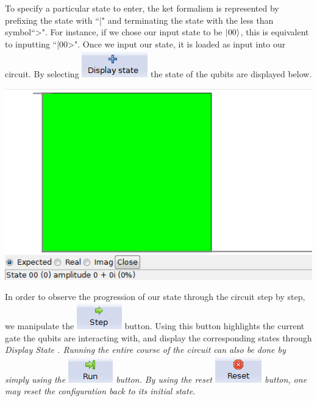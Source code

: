 \documentclass[10pt]{article}
\theoremstyle{definition}
\newcommand{\microspace}{\mspace{0.5mu}}
\def \lket {\left|}
\def \rket {\right\rangle}
\newcommand{\ket}[1]{\lket\microspace #1 \microspace\rket}
\begin{document}
To specify a particular state to enter, the ket formalism is represented by prefixing the state with ``|"  and terminating the state with the less than symbol``>". For instance, if we chose our input state to be $\ket{00}$, this is equivalent to inputting ``|00>". Once we input our state, it is loaded as input into our circuit. By selecting \includegraphics[scale=0.60]{Figures/Navigation/DisplayState.png} the state of the qubits are displayed below.

\begin{center}
\includegraphics{Figures/CreateCircuit/DisplayState.png}
\end{center}

In order to observe the progression of our state through the circuit step by step, we manipulate the \includegraphics[scale=0.60]{Figures/Navigation/Step.png} button. Using this button highlights the current gate the qubits are interacting with, and display the corresponding states through \em Display State \em. Running the entire course of the circuit can also be done by simply using the \includegraphics[scale=0.60]{Figures/Navigation/Run.png} button. By using the reset \includegraphics[scale=0.60]{Figures/Navigation/Reset.png} button, one may reset the configuration back to its initial state.
\end{document}
